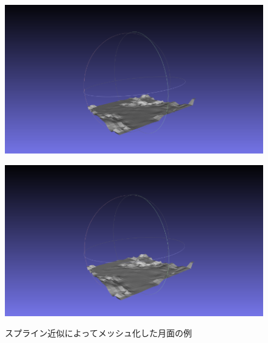 \begin{figure}[htbp]
\begin{minipage}[b]{0.49\linewidth}
        \label{fig:spline6}
      \end{minipage}
      \begin{minipage}[b]{0.49\linewidth}
        \centering
        \includegraphics[keepaspectratio, scale=0.45]{images/spline7.png}
        \label{fig:spline7}
      \end{minipage}
      \begin{minipage}[b]{0.49\linewidth}
        \centering
        \includegraphics[keepaspectratio, scale=0.45]{images/spline8.png}
        \label{fig:spline8}
      \end{minipage}
    \caption{スプライン近似によってメッシュ化した月面の例}\label{fig:mesh_moons}
  \end{figure}